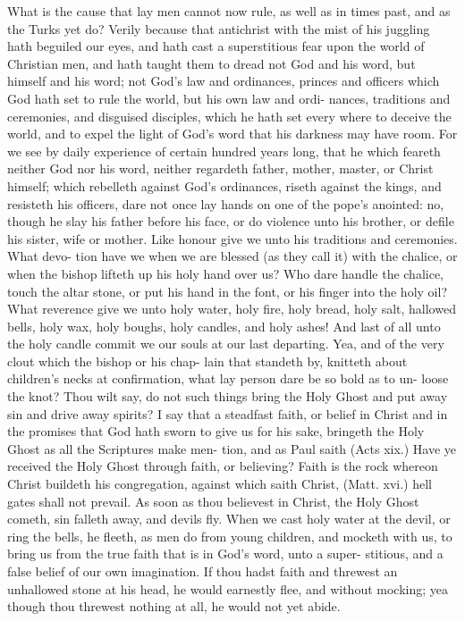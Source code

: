 \documentclass{custom}
\begin{document}
What is the cause that lay men cannot now rule, as 
well as in times past, and as the Turks yet do? Verily 
because that antichrist with the mist of his juggling hath 
beguiled our eyes, and hath cast a superstitious fear upon 
the world of Christian men, and hath taught them to 
dread not God and his word, but himself and his word; 
not God's law and ordinances, princes and officers which 
God hath set to rule the world, but his own law and ordi- 
nances, traditions and ceremonies, and disguised disciples, 
which he hath set every where to deceive the world, and 
to expel the light of God's word that his darkness may 
have room. For we see by daily experience of certain 
hundred years long, that he which feareth neither God nor 
his word, neither regardeth father, mother, master, or 
Christ himself; which rebelleth against God's ordinances, 
riseth against the kings, and resisteth his officers, dare not 
once lay hands on one of the pope's anointed: no, though 
he slay his father before his face, or do violence unto his 
brother, or defile his sister, wife or mother. Like honour 
give we unto his traditions and ceremonies. What devo- 
tion have we when we are blessed (as they call it) with the 
chalice, or when the bishop lifteth up his holy hand over 
us? Who dare handle the chalice, touch the altar stone, 
or put his hand in the font, or his finger into the holy 
oil? What reverence give we unto holy water, holy fire, 
holy bread, holy salt, hallowed bells, holy wax, holy 
boughs, holy candles, and holy ashes! And last of all unto 
the holy candle commit we our souls at our last departing. 
Yea, and of the very clout which the bishop or his chap- 
lain that standeth by, knitteth about children's necks at 
confirmation, what lay person dare be so bold as to un- 
loose the knot? Thou wilt say, do not such things bring 
the Holy Ghost and put away sin and drive away spirits? 
I say that a steadfast faith, or belief in Christ and in the 
promises that God hath sworn to give us for his sake, 
bringeth the Holy Ghost as all the Scriptures make men- 
tion, and as Paul saith (Acts xix.) Have ye received the 
Holy Ghost through faith, or believing? Faith is the 
rock whereon Christ buildeth his congregation, against 
which saith Christ, (Matt. xvi.) hell gates shall not prevail. 
As soon as thou believest in Christ, the Holy Ghost 
cometh, sin falleth away, and devils fly. When we cast 
holy water at the devil, or ring the bells, he fleeth, as men 
do from young children, and mocketh with us, to bring 
us from the true faith that is in God's word, unto a super- 
stitious, and a false belief of our own imagination. If 
thou hadst faith and threwest an unhallowed stone at 
his head, he would earnestly flee, and without mocking; 
yea though thou threwest nothing at all, he would not yet 
abide. 
\end{document}
